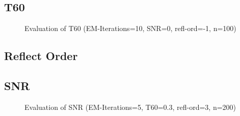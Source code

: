 \subsection*{T60}
\begin{figure}[H]
    \centering
    \begin{subfigure}{0.49\textwidth}
          \centering
	       
%            
	\end{subfigure}
    \begin{subfigure}{0.49\textwidth}
          \centering
	       
%            
	\end{subfigure}
\caption{Evaluation of T60 (EM-Iterations=10, SNR=0, refl-ord=-1, n=100)}
\end{figure}

\subsection*{Reflect Order}
%	       
%	       

\subsection*{SNR}
\begin{figure}[H]
    \centering
    \begin{subfigure}{0.49\textwidth}
          \centering
	       
%            
	\end{subfigure}
    \begin{subfigure}{0.49\textwidth}
          \centering
	       
%            
	\end{subfigure}
\caption{Evaluation of SNR (EM-Iterations=5, T60=0.3, refl-ord=3, n=200)}
\end{figure}
